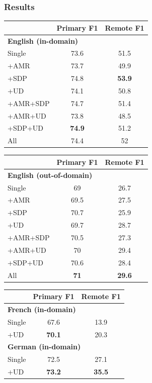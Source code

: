\documentclass[t,handout,xcolor={svgnames}]{beamer}
\begin{document}
\begin{frame}
\frametitle{Results}
\centering
\small
\setlength\tabcolsep{3pt}
\begin{tabular}{lcc}
& \footnotesize \bf Primary F1 & \footnotesize \bf Remote F1 \\
\hline
\multicolumn{3}{l}{\small \bf English (in-domain)} \\
\footnotesize Single
& 73.6 & 51.5 \\
\cline{1-1}
\footnotesize +AMR
& 73.7 & 49.9 \\
\footnotesize +SDP
& 74.8 & \textbf{53.9} \\
\footnotesize +UD
& 74.1 & 50.8 \\
\footnotesize +AMR+SDP
& 74.7 & 51.4 \\
\footnotesize +AMR+UD
& 73.8 & 48.5 \\
\footnotesize +SDP+UD
& \textbf{74.9} & 51.2 \\
\footnotesize All
& 74.4 & 52
\end{tabular}
\hfill
\begin{tabular}{lcc}
& \footnotesize \bf Primary F1 & \footnotesize \bf Remote F1 \\
\hline
\multicolumn{3}{l}{\small \bf English (out-of-domain)} \\
\footnotesize Single
& 69 & 26.7 \\
\cline{1-1}
\footnotesize +AMR
& 69.5 & 27.5 \\
\footnotesize +SDP
& 70.7 & 25.9 \\
\footnotesize +UD
& 69.7 & 28.7 \\
\footnotesize +AMR+SDP
& 70.5 & 27.3 \\
\footnotesize +AMR+UD
& 70 & 29.4 \\
\footnotesize +SDP+UD
& 70.6 & 28.4 \\
\footnotesize All
& \textbf{71} & \textbf{29.6}
\end{tabular}
\vfill
\begin{tabular}{lcc}
& \footnotesize \bf Primary F1 & \footnotesize \bf Remote F1 \\
\hline
\multicolumn{3}{l}{\small \bf French (in-domain)} \\
\small Single & 67.6 & 13.9 \\
\small +UD & \textbf{70.1} & 20.3 \\
\hline
\multicolumn{3}{l}{\small \bf German (in-domain)} \\
\small Single & 72.5 & 27.1 \\
\small +UD & \textbf{73.2} & \textbf{35.5}
\end{tabular}
\end{frame}
\end{document}
